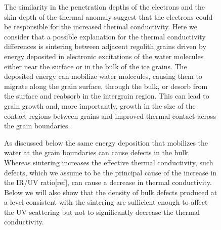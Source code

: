 \documentclass[11pt]{article} %
\begin{document}
\begin{figure}[ht]



	
	The similarity in the penetration depths of the electrons and the skin depth of the thermal anomaly suggest that the electrons could be responsible for the increased thermal conductivity.  Here we consider that a possible explanation for the thermal conductivity differences is sintering between adjacent regolith grains driven by energy deposited in electronic excitations of the water molecules either near the surface or in the bulk of the ice grains. The deposited energy can mobilize water molecules, causing them to migrate along the grain surface, through the bulk, or desorb from the surface and reabsorb in the intergrain region. This can lead to grain growth and, more importantly, growth in the size of the contact regions between grains and improved thermal contact  across the grain boundaries.
	
	 As discussed below the same energy deposition that mobilizes the water at the grain boundaries can cause defects in the bulk. Whereas sintering increases the effective thermal conductivity, such defects, which we assume to be the principal cause of the increase in the IR/UV ratio[ref], can cause a decrease in thermal conductivity. Below we will also show that the density of bulk defects produced at a level consistent with the sintering are sufficient enough to affect the UV scattering but not to significantly decrease the thermal conductivity.
	
	

\end{figure}
\end{document}
